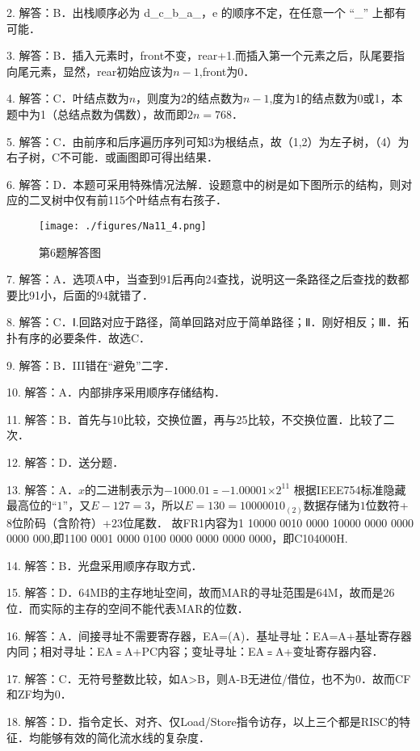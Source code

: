 2. 解答：B．出栈顺序必为 d\_c\_b\_a\_，e 的顺序不定，在任意一个 “\_” 上都有可能．

3. 解答：B．插入元素时，front不变，rear+1.而插入第一个元素之后，队尾要指向尾元素，显然，rear初始应该为$n-1$,front为$0$．

4. 解答：C．叶结点数为$n$，则度为2的结点数为$n-1$,度为1的结点数为0或1，本题中为1（总结点数为偶数），故而即$2n=768$．

5. 解答：C．由前序和后序遍历序列可知3为根结点，故（1,2）为左子树，（4）为右子树，C不可能．或画图即可得出结果．

6. 解答：D．本题可采用特殊情况法解．设题意中的树是如下图所示的结构，则对应的二叉树中仅有前115个叶结点有右孩子．\\
\begin{figure}[ht]
\centering
\texttt{[image: ./figures/Na11\_4.png]}
\caption{第6题解答图} \label{Na11_fig4}
\end{figure}

7. 解答：A．选项A中，当查到91后再向24查找，说明这一条路径之后查找的数都要比91小，后面的94就错了．

8. 解答：C．Ⅰ.回路对应于路径，简单回路对应于简单路径；Ⅱ．刚好相反；Ⅲ．拓扑有序的必要条件．故选C．

9. 解答：B．III错在“避免”二字．

10. 解答：A．内部排序采用顺序存储结构．

11. 解答：B．首先与10比较，交换位置，再与25比较，不交换位置．比较了二次．

12. 解答：D．送分题．

13. 解答：A．$x$的二进制表示为$-1000.01$﹦$-1.000 01$×$2^{11}$ 根据IEEE754标准隐藏最高位的“$1$”，又$E-127=3$，所以$E=130=1000 0010_{(2)}$数据存储为$1$位数符+$8$位阶码（含阶符）+$23$位尾数．
故FR1内容为1 10000 0010 0000 10000 0000 0000 0000 000,即1100 0001 0000 0100 0000 0000 0000 0000，即C104000H.

14. 解答：B．光盘采用顺序存取方式．

15. 解答：D．64MB的主存地址空间，故而MAR的寻址范围是64M，故而是26位．而实际的主存的空间不能代表MAR的位数．

16. 解答：A．间接寻址不需要寄存器，EA=(A)．基址寻址：EA=A+基址寄存器内同；相对寻址：EA﹦A+PC内容；变址寻址：EA﹦A+变址寄存器内容．

17. 解答：C．无符号整数比较，如A>B，则A-B无进位/借位，也不为0．故而CF和ZF均为0．

18. 解答：D．指令定长、对齐、仅Load/Store指令访存，以上三个都是RISC的特征．均能够有效的简化流水线的复杂度．

